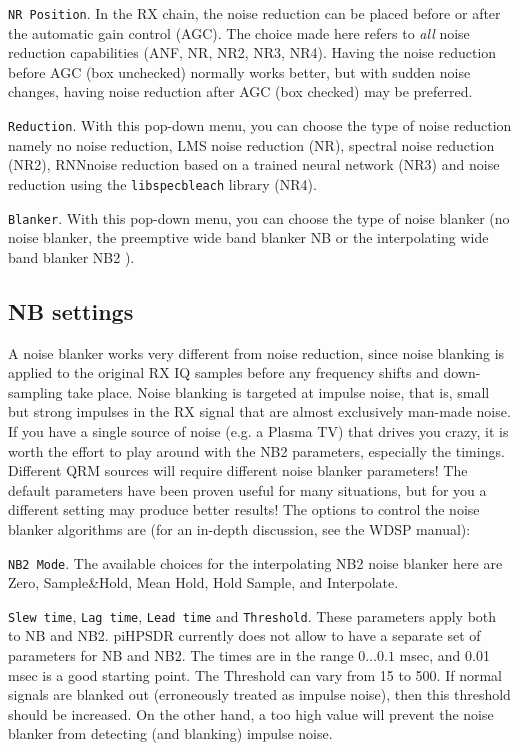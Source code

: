 \documentclass[12pt]{book}
\def\rett#1{\texttt{\color{red}#1}}
\def\pH{pi\-HPSDR\xspace}
\begin{document}
\rett{NR Position}. In the RX chain, the noise reduction can be placed before or after
the automatic gain control (AGC). The choice made here refers to \textit{all} noise reduction
capabilities (ANF, NR, NR2, NR3, NR4). Having the noise reduction before AGC
(box unchecked) normally works better,
but with sudden noise changes, having noise reduction after AGC (box checked) may be preferred.

\rett{Reduction}. With this pop-down menu, you can choose the type of noise reduction
namely no noise reduction, LMS noise reduction (NR), spectral noise reduction (NR2),
RNNnoise reduction based on a trained neural network (NR3) and noise reduction using
the \texttt{libspecbleach} library (NR4).

\rett{Blanker}. With this pop-down menu, you can choose the type of noise blanker
(no noise blanker, the preemptive wide band blanker NB or the interpolating wide band
blanker NB2 ).

\subsection{NB settings}

A noise blanker works very different from  noise reduction, since noise blanking
is applied to the original RX IQ samples before any frequency shifts and down-sampling take place.
Noise blanking is targeted at impulse noise, that is, small but strong impulses in the RX
signal that are almost exclusively man-made noise.
If you have a single source of noise (e.g. a Plasma TV) that drives you crazy, it is worth
the effort to play around with the NB2 parameters, especially the timings. Different
QRM sources will require different noise blanker parameters! The default parameters have been proven useful
for many situations, but for you a different setting may produce better results!
The options to control the noise blanker algorithms are (for an in-depth discussion,
see the WDSP manual):

\rett{NB2 Mode}. The available choices for the interpolating NB2 noise blanker here are Zero,
Sample\&Hold, Mean Hold, Hold Sample, and Interpolate.

\rett{Slew time}, \rett{Lag time}, \rett{Lead time} and \rett{Threshold}.
These parameters apply both to NB and NB2.
\pH currently does not allow to have a separate set of parameters for NB and NB2.
The times are in the range $0\ldots0.1$ msec, and 0.01 msec is a good starting point. The Threshold
can vary from 15 to 500. If normal signals are blanked out (erroneously treated as impulse noise),
then this threshold should be increased. On the other hand, a too high value will prevent the
noise blanker from detecting (and blanking) impulse noise.
\end{document}
